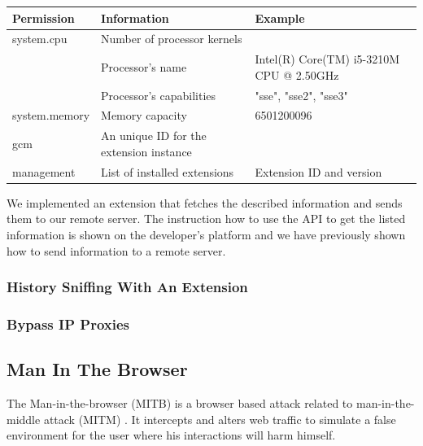 	\begin{tabular}{l|l|l}
		\textbf{Permission} & \textbf{Information} & \textbf{Example} \\ \hline
		system.cpu & Number of processor kernels & \\
		& Processor's name & Intel(R) Core(TM) i5-3210M CPU @ 2.50GHz \\
		& Processor's capabilities & "sse", "sse2", "sse3"  \\ 
		system.memory & Memory capacity & 6501200096 \\
		gcm & An unique ID for the extension instance & \\
		management & List of installed extensions & Extension ID and version \\
	\end{tabular} 
	
	We implemented an extension that fetches the described information and sends them to our remote server. The instruction how to use the API to get the listed information is shown on the developer's platform and we have previously shown how to send information to a remote server. \\
	
	
	\subsubsection{History Sniffing With An Extension}
	
	
	\subsubsection{Bypass IP Proxies}
	
	
	\subsection{Man In The Browser}
	
	The Man-in-the-browser (MITB) is a browser based attack related to man-in-the-middle attack (MITM) \cite{Curran:2012:MBA:2433195.2433198}. It intercepts and alters web traffic to simulate a false environment for the user where his interactions will harm himself. \\
	
